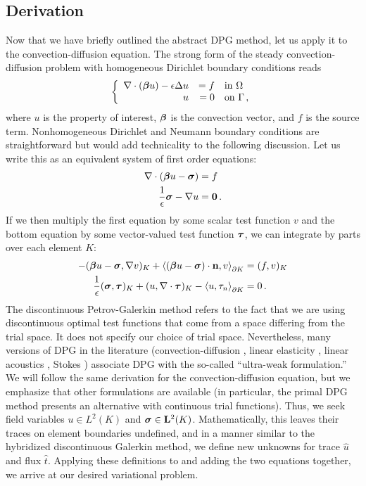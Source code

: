 \documentclass[Proposal.tex]{subfiles}
\begin{document}
\subsection{Derivation}
Now that we have briefly outlined the abstract DPG method, let us apply it to
the convection-diffusion equation. The strong form of the steady
convection-diffusion problem with homogeneous Dirichlet boundary conditions reads
\[
\left\{
\begin{array}[c]{rrl}
\nabla\cdot(\boldsymbol{\beta} u)-\epsilon\Delta u & =f & \text{in }\Omega\\
u & =0 & \text{on }\Gamma\,,
\end{array}
\right.
\]
where $u$ is the property of interest, $\boldsymbol{\beta}$ is the convection vector,
and $f$ is the source term. Nonhomogeneous Dirichlet and Neumann boundary
conditions are straightforward but would add technicality to the following
discussion. Let us write this as an equivalent system of first
order equations:
\begin{align*}
\nabla\cdot(\boldsymbol{\beta} u-\boldsymbol{\sigma})&=f\\
\frac{1}{\epsilon}\boldsymbol{\sigma}-\nabla u&=\boldsymbol{0}\,.
\end{align*}
If we then multiply the first equation by some scalar test function $v$ and the
bottom equation by some vector-valued test function $\boldsymbol\tau$, we can integrate by
parts over each element $K$:
\begin{equation}
\label{eq:preultraweak}
\begin{aligned}
-(\boldsymbol\beta u-\boldsymbol\sigma,\nabla v)_K+\left\langle (\boldsymbol\beta
u-\boldsymbol\sigma)\cdot\mathbf{n},v \right\rangle_{\partial K}&=(f,v)_K\\
\frac{1}{\epsilon}(\boldsymbol\sigma,\boldsymbol\tau)_K+(u,\nabla\cdot\boldsymbol\tau)_K
-\left\langle u,\tau_n \right\rangle_{\partial K}&=0\,.
\end{aligned}
\end{equation}
The discontinuous Petrov-Galerkin method refers to the fact that we are using
discontinuous optimal test functions that come from a space differing from the
trial space. It does not specify our choice of trial space. Nevertheless, many
versions of DPG in the literature (convection-diffusion \cite{DPG6},
linear elasticity \cite{BramwellDPG}, linear
acoustics \cite{DPGHelmholtz}, Stokes
\cite{DPGStokes}) associate DPG with the so-called ``ultra-weak formulation.''
We will follow the same derivation for the convection-diffusion equation, but
we emphasize that other formulations are available (in particular, the
primal DPG\cite{PrimalDPG} method presents an alternative with
continuous trial functions). Thus, we seek field variables $u\in L^2(K)$ and
$\boldsymbol\sigma\in\mathbf{L}^2(K)$. Mathematically, this leaves their traces on element
boundaries undefined, and in a manner similar to the hybridized discontinuous
Galerkin method, we define new unknowns for trace $\hat u$ and flux $\hat t$.
Applying these definitions to  and adding the two
equations together, we arrive at our desired variational problem.
\end{document}
